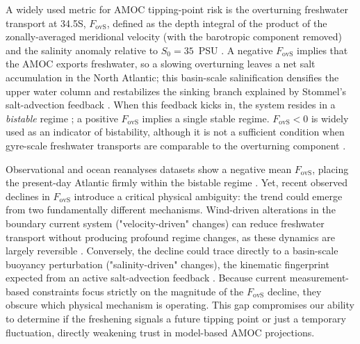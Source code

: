 \documentclass[11pt,a4paper]{article}
\begin{document}
A widely used metric for AMOC tipping-point risk is the overturning freshwater transport at 34.5\textdegree S, $F_{\mathrm{ovS}}$, defined as the depth integral of the product of the zonally-averaged meridional velocity (with the barotropic component removed) and the salinity anomaly relative to $S_0 = 35$~PSU \citep{deVriesWeber2005, HofmannRahmstorf2009}. A negative $F_{\mathrm{ovS}}$ implies that the AMOC exports freshwater, so a slowing overturning leaves a net salt accumulation in the North Atlantic; this basin-scale salinification densifies the upper water column and restabilizes the sinking branch explained by Stommel's salt-advection feedback \citep{Stommel1961}. When this feedback kicks in, the system resides in a \emph{bistable} regime \citep{Rahmstorf1996, Dijkstra2007, vanWesten2024, Cimatoribus2014}; a positive $F_{\mathrm{ovS}}$ implies a single stable regime. $F_{\mathrm{ovS}}<0$ is widely used as an indicator of bistability, although it is not a sufficient condition when gyre-scale freshwater transports are comparable to the overturning component \citep{Gent2018}.

Observational and ocean reanalyses datasets show a negative mean \(F_{\mathrm{ovS}}\), placing the present-day Atlantic firmly within the bistable regime \citep{ArumiPlanas2024, Portmann2026}. Yet, recent observed declines in \(F_{\mathrm{ovS}}\) introduce a critical physical ambiguity: the trend could emerge from two fundamentally different mechanisms. Wind-driven alterations in the boundary current system ("velocity-driven" changes) can reduce freshwater transport without producing profound regime changes, as these dynamics are largely reversible \citep{Chemke2021}. Conversely, the decline could trace directly to a basin-scale buoyancy perturbation ("salinity-driven" changes), the kinematic fingerprint expected from an active salt-advection feedback \citep{deVriesWeber2005, Drijfhout2011, vanWesten2024, Liu2017, Sgubin2017, FallahInReview}. Because current measurement-based constraints focus strictly on the magnitude of the \(F_{\mathrm{ovS}}\) decline, they obscure which physical mechanism is operating. This gap compromises our ability to determine if the freshening signals a future tipping point or just a temporary fluctuation, directly weakening trust in model-based AMOC projections.
\end{document}
